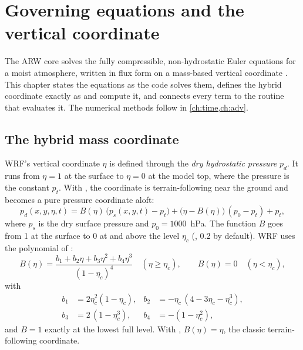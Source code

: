 \chapter{Governing equations and the vertical coordinate}\label{ch:eq}

The ARW core solves the fully compressible, non-hydrostatic Euler equations for a moist atmosphere, written in flux
form on a mass-based vertical coordinate \citep{skamarock2019}. This chapter states the equations as the code solves
them, defines the hybrid coordinate exactly as  and  compute it, and connects every term
to the routine that evaluates it. The numerical methods follow in \cref{ch:time,ch:adv}.

\section{The hybrid mass coordinate}

WRF's vertical coordinate $\eta$ is defined through the \emph{dry hydrostatic pressure} $p_d$. It runs from
$\eta = 1$ at the surface to $\eta = 0$ at the model top, where the pressure is the constant $p_t$. With
, the coordinate is terrain-following near the ground and becomes a pure pressure coordinate
aloft:
\begin{equation}
  p_d(x, y, \eta, t) = B(\eta)\,\bigl(p_s(x,y,t) - p_t\bigr) + \bigl(\eta - B(\eta)\bigr)\,(p_0 - p_t) + p_t ,
  \label{eq:hybrid}
\end{equation}
where $p_s$ is the dry surface pressure and $p_0 = 1000$~hPa. The function $B$ goes from 1 at the surface to 0 at
and above the level $\eta_c$ (, 0.2 by default). WRF uses the polynomial of
:
\begin{equation}
  B(\eta) = \frac{b_1 + b_2\eta + b_3\eta^2 + b_4\eta^3}{(1-\eta_c)^4}
  \quad (\eta \ge \eta_c), \qquad B(\eta) = 0 \quad (\eta < \eta_c),
  \label{eq:B}
\end{equation}
with
\begin{align*}
  b_1 &= 2\eta_c^2(1-\eta_c), & b_2 &= -\eta_c\,(4 - 3\eta_c - \eta_c^3), \\
  b_3 &= 2\,(1-\eta_c^3), & b_4 &= -(1-\eta_c^2),
\end{align*}
and $B = 1$ exactly at the lowest full level. With , $B(\eta) = \eta$, the classic
terrain-following coordinate.

